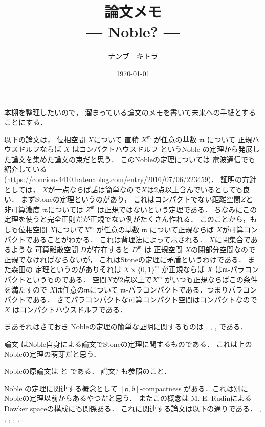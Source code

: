 \documentclass[leqno, a4paper, 12pt]{jsarticle}
\title{論文メモ
\large{\\--- Noble? ---}
}
\author{ナンブ　キトラ}
\date{\today}
\begin{document}
\maketitle


本棚を整理したいので，
溜まっている論文のメモを書いて未来への手紙とすることにする．


以下の論文は，
位相空間
$X$について
直積
$X^{\mathfrak{m}}$
が任意の基数
$\mathfrak{m}$
について
正規ハウスドルフならば
$X$
はコンパクトハウスドルフ
というNoble
の定理から発展した論文を集めた論文の束だと思う．
このNobleの定理については
電波通信でも紹介している
(https://concious4410.hatenablog.com/entry/2016/07/06/223459)．
証明の方針としては，
$X$が一点ならば話は簡単なので$X$は2点以上含んでいるとしても良い．
まずStoneの定理というのがあり，
これはコンパクトでない距離空間$Z$と
非可算濃度
$\mathfrak{m}
$については
$Z^{\mathfrak{m}}$
は正規ではないという定理である．
ちなみにこの定理を使うと完全正則だが正規でない例がたくさん作れる．
このことから，もしも位相空間
$X$について$X^{\mathfrak{m}}$
が任意の基数
$\mathfrak{m}$
について正規ならば
$X$が可算コンパクトであることがわかる．
これは背理法によって示される．
$X$に閉集合であるような
可算離散空間
$D$が存在すると
$D^{\mathfrak{m}}$
は
正規空間
$X$の閉部分空間なので正規でなければならないが，
これはStoneの定理に矛盾というわけである．
また森田の
定理というのがありそれは
$X\times \{0, 1\}^{\mathfrak{m}}$
が正規ならば
$X$
は$\mathfrak{m}$-パラコンパクトというものである．
空間$X$が2点以上で$X^{\mathfrak{m}}$
がいつも正規ならばこの条件を満たすので
$X$は任意の$\mathfrak{m}$について
$\mathfrak{m}$-パラコンパクトである．つまりパラコンパクトである．
さてパラコンパクトな可算コンパクト空間はコンパクトなので
$X$
はコンパクトハウスドルフである．

まあそれはさておき
Nobleの定理の簡単な証明に関するものは
\cite{engelking1988elementary}, 
\cite{franklin1972normality}, 
\cite{keesling1972normality}, 
\cite{polkowski1979n}
である．


論文
\cite{noble1967generalization}
はNoble自身による論文でStoneの定理に関するものである．
これは上の
Nobleの定理の萌芽だと思う．

Nobleの原論文は
\cite{MR0250261}
と
\cite{MR0283749}
である．
論文?
\cite{Fleischer1967}
も参照のこと．


Noble
の定理に関連する概念として
$[\mathfrak{a}, \mathfrak{b}]$-compactness
がある．これは別にNobleの定理以前からあるやつだと思う．
またこの概念は
M. E. RudinによるDowker spaceの構成にも関係ある．
これに関連する論文は以下の通りである．
\cite{Vaughan1975}, 
\cite{LIPPARINI20061365}, 
\cite{butcherjoseph1976}, 
\cite{HODEL1974179}, 
\cite{shirayama2007note}, 
\cite{gal1958theory}. 



\nocite{*}


\end{document}
